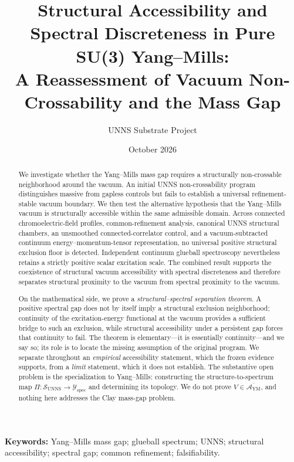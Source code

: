 \documentclass[11pt,a4paper]{article}
\title{\textbf{Structural Accessibility and Spectral Discreteness in Pure SU(3) Yang--Mills:}\\[2pt]
\large A \uns{} Reassessment of Vacuum Non-Crossability and the Mass Gap}
\author{UNNS Substrate Project}
\date{October 2026}
\theoremstyle{definition}
\theoremstyle{remark}
\newcommand{\AYM}{\mathcal{A}_{\mathrm{YM}}}
\newcommand{\SUNNS}{\mathcal{S}_{\mathrm{UNNS}}}
\newcommand{\Yspec}{\mathcal{Y}_{\mathrm{spec}}}
\newcommand{\uns}{UNNS}
\begin{document}
\maketitle

\begin{abstract}
\noindent We investigate whether the Yang--Mills mass gap requires a structurally non-crossable neighborhood around the vacuum. An initial \uns{} non-crossability program distinguishes massive from gapless controls but fails to establish a universal refinement-stable vacuum boundary. We then test the alternative hypothesis that the Yang--Mills vacuum is structurally accessible within the same admissible domain. Across connected chromoelectric-field profiles, common-refinement analysis, canonical \uns{} structural chambers, an unsmoothed connected-correlator control, and a vacuum-subtracted continuum energy--momentum-tensor representation, no universal positive structural exclusion floor is detected. Independent continuum glueball spectroscopy nevertheless retains a strictly positive scalar excitation scale. The combined result supports the coexistence of structural vacuum accessibility with spectral discreteness and therefore separates structural proximity to the vacuum from spectral proximity to the vacuum.

\smallskip\noindent On the mathematical side, we prove a \emph{structural--spectral separation theorem}. A positive spectral gap does not by itself imply a structural exclusion neighborhood; continuity of the excitation-energy functional at the vacuum provides a sufficient bridge to such an exclusion, while structural accessibility under a persistent gap forces that continuity to fail. The theorem is elementary---it is essentially continuity---and we say so; its role is to locate the missing assumption of the original program. We separate throughout an \emph{empirical} accessibility statement, which the frozen evidence supports, from a \emph{limit} statement, which it does not establish. The substantive open problem is the specialization to Yang--Mills: constructing the structure-to-spectrum map $\Pi:\SUNNS\to\Yspec$ and determining its topology. We do not prove $V\in\overline{\AYM}$, and nothing here addresses the Clay mass-gap problem.
\end{abstract}

\vspace{2pt}
\noindent\textbf{Keywords:} Yang--Mills mass gap; glueball spectrum; UNNS; structural accessibility; spectral gap; common refinement; falsifiability.
\end{document}

